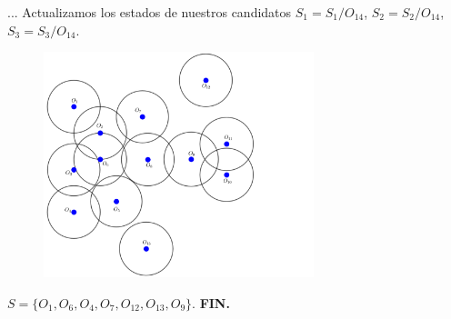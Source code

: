 \begin{frame}{...}
  Actualizamos los estados de nuestros candidatos $S_1 = S_1/O_{14}$,
  $S_2 = S_2/O_{14}$, $S_3 = S_3/O_{14}$.
  \begin{figure}  
    \centering
    \includegraphics[width=0.7\textwidth]{./Images/10.png}
  \end{figure}
    $S = \{O_1, O_6, O_4, O_7, O_{12}, O_{13}, O_9\}$. \textbf{FIN.}
\end{frame}
